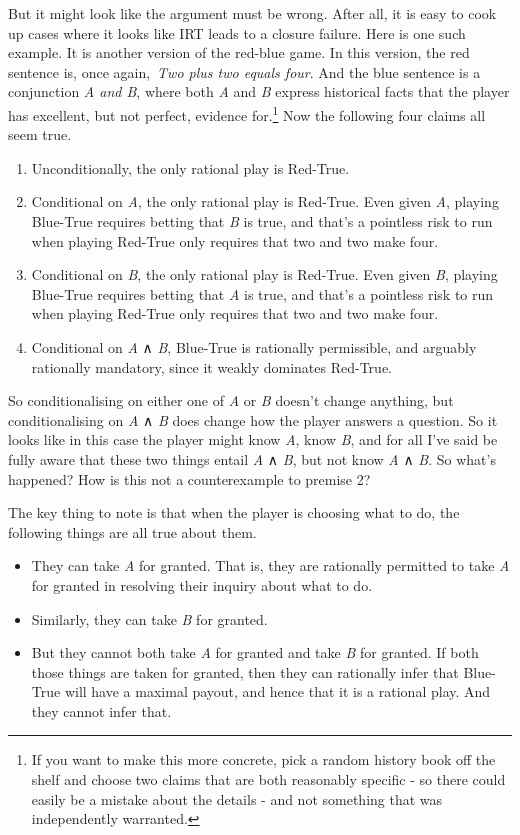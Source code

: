 \documentclass[
  11pt,
]{book}
\providecommand{\tightlist}{%
  \setlength{\itemsep}{0pt}\setlength{\parskip}{0pt}}
\begin{document}
But it might look like the argument must be wrong. After all, it is easy to cook up cases where it looks like IRT leads to a closure failure. Here is one such example. It is another version of the red-blue game. In this version, the red sentence is, once again,~\emph{Two plus two equals four}. And the blue sentence is a conjunction \emph{A and B}, where both \emph{A} and \emph{B} express historical facts that the player has excellent, but not perfect, evidence for.\footnote{If you want to make this more concrete, pick a random history book off the shelf and choose two claims that are both reasonably specific - so there could easily be a mistake about the details - and not something that was independently warranted.} Now the following four claims all seem true.

\begin{enumerate}
\def\labelenumi{\arabic{enumi}.}
\tightlist
\item
  Unconditionally, the only rational play is Red-True.
\item
  Conditional on \emph{A}, the only rational play is Red-True. Even given \emph{A}, playing Blue-True requires betting that \emph{B} is true, and that's a pointless risk to run when playing Red-True only requires that two and two make four.
\item
  Conditional on \emph{B}, the only rational play is Red-True. Even given \emph{B}, playing Blue-True requires betting that \emph{A} is true, and that's a pointless risk to run when playing Red-True only requires that two and two make four.
\item
  Conditional on \emph{A} ∧ \emph{B}, Blue-True is rationally permissible, and arguably rationally mandatory, since it weakly dominates Red-True.
\end{enumerate}

So conditionalising on either one of \emph{A} or \emph{B} doesn't change anything, but conditionalising on \emph{A} ∧ \emph{B} does change how the player answers a question. So it looks like in this case the player might know \emph{A}, know \emph{B}, and for all I've said be fully aware that these two things entail \emph{A} ∧ \emph{B}, but not know \emph{A} ∧ \emph{B}. So what's happened? How is this not a counterexample to premise 2?

The key thing to note is that when the player is choosing what to do, the following things are all true about them.

\begin{itemize}
\tightlist
\item
  They can take \emph{A} for granted. That is, they are rationally permitted to take \emph{A} for granted in resolving their inquiry about what to do.
\item
  Similarly, they can take \emph{B} for granted.
\item
  But they cannot both take \emph{A} for granted and take \emph{B} for granted. If both those things are taken for granted, then they can rationally infer that Blue-True will have a maximal payout, and hence that it is a rational play. And they cannot infer that.
\end{itemize}
\end{document}

